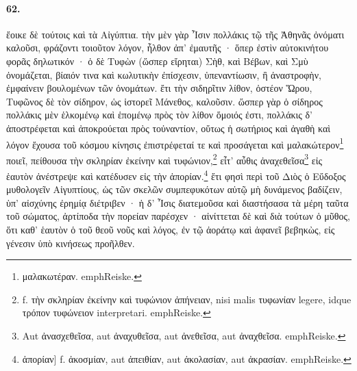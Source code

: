 \documentclass[a4paper, 11pt, oneside, polutonikogreek, german]{article}
\begin{document}
\paragraph{62.}
ἔοικε δὲ τούτοις καὶ τὰ Αἰγύπτια. τὴν μὲν γὰρ Ἶσιν πολλάκις τῷ τῆς Ἀθηνᾶς ὀνόματι καλοῦσι, φράζοντι τοιοῦτον λόγον, ἦλθον ἀπ' ἐμαυτῆς · ὅπερ ἐστὶν αὐτοκινήτου φορᾶς δηλωτικόν · ὁ δὲ Τυφὼν (ὥσπερ εἴρηται) Σὴθ, καὶ Βέβων, καὶ Σμὺ ὀνομάζεται, βίαιόν τινα καὶ κωλυτικὴν ἐπίσχεσιν, ὑπεναντίωσιν, ἢ ἀναστροφὴν, ἐμφαίνειν βουλομένων τῶν ὀνομάτων. ἔτι τὴν σιδηρῖτιν λίθον, ὀστέον Ὥρου, Τυφῶνος δὲ τὸν σίδηρον, ὡς ἱστορεῖ Μάνεθος, καλοῦσιν. ὥσπερ γὰρ ὁ σίδηρος πολλάκις μὲν ἑλκομένῳ καὶ ἑπομένῳ πρὸς τὸν λίθον ὅμοιός ἐστι, πολλάκις δ' ἀποστρέφεται καὶ ἀποκρούεται πρὸς τοὐναντίον, οὕτως ἡ σωτήριος καὶ ἀγαθὴ καὶ λόγον ἔχουσα τοῦ κόσμου κίνησις ἐπιστρέφεταί τε καὶ προσάγεται καὶ μαλακώτερον\footnote{μαλακωτέραν. emph{Reiske.}} ποιεῖ, πείθουσα τὴν σκληρίαν ἐκείνην καὶ τυφώνιον,\footnote{f. τὴν σκληρίαν ἐκείνην καὶ τυφώνιον ἀπήνειαν, nisi malis τυφωνίαν legere, idque τρόπον τυφώνειον interpretari. emph{Reiske.}} εἶτ' αὖθις ἀναχεθεῖσα\footnote{Aut ἀνασχεθεῖσα, aut ἀναχυθεῖσα, aut ἀνεθεῖσα, aut ἀναχθεῖσα. emph{Reiske.}} εἰς ἑαυτὸν ἀνέστρεψε καὶ κατέδυσεν εἰς τὴν ἀπορίαν.\footnote{ἀπορίαν] f. ἀκοσμίαν, aut ἀπειθίαν, aut ἀκολασίαν, aut ἀκρασίαν. emph{Reiske.}} ἔτι φησὶ περὶ τοῦ Διὸς ὁ Εὔδοξος μυθολογεῖν Αἰγυπτίους, ὡς τῶν σκελῶν συμπεφυκότων αὐτῷ μὴ δυνάμενος βαδίζειν, ὑπ' αἰσχύνης ἐρημίᾳ διέτριβεν · ἡ δ' Ἶσις διατεμοῦσα καὶ διαστήσασα τὰ μέρη ταῦτα τοῦ σώματος, ἀρτίποδα τὴν πορείαν παρέσχεν · αἰνίττεται δὲ καὶ διὰ τούτων ὁ μῦθος, ὅτι καθ' ἑαυτὸν ὁ τοῦ θεοῦ νοῦς καὶ λόγος, ἐν τῷ ἀοράτῳ καὶ ἀφανεῖ βεβηκὼς, εἰς γένεσιν ὑπὸ κινήσεως προῆλθεν.
\end{document}
